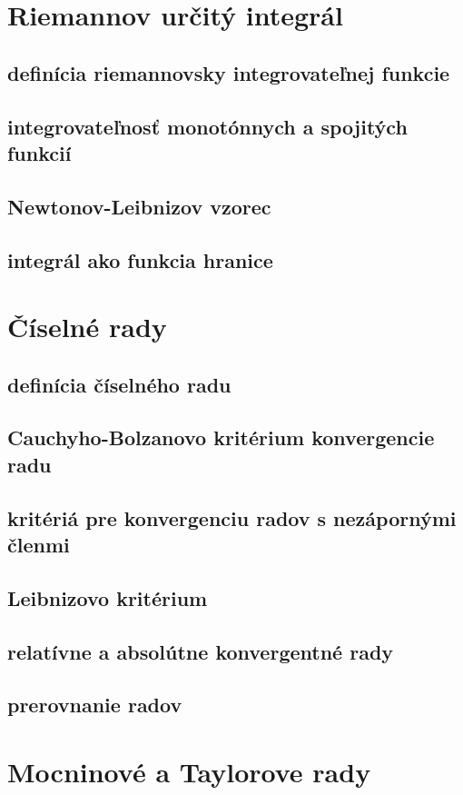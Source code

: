 \section{Riemannov určitý integrál}
\subsection{definícia riemannovsky integrovateľnej funkcie}
\subsection{integrovateľnosť monotónnych a spojitých funkcií}
\subsection{Newtonov-Leibnizov vzorec}
\subsection{integrál ako funkcia hranice}


\section{Číselné rady}
\subsection{definícia číselného radu}
\subsection{Cauchyho-Bolzanovo kritérium konvergencie radu}
\subsection{kritériá pre konvergenciu radov s nezápornými členmi}
\subsection{Leibnizovo kritérium}
\subsection{relatívne a absolútne konvergentné rady}
\subsection{prerovnanie radov}


\section{Mocninové a Taylorove rady}

